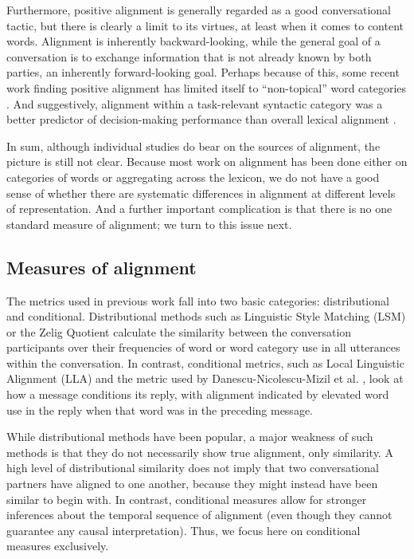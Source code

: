 \documentclass[11pt]{article}
\begin{document}
Furthermore, positive alignment is generally regarded as a good conversational tactic, but there is clearly a limit to its virtues, at least when it comes to content words. Alignment is inherently backward-looking, while the general goal of a conversation is to exchange information that is not already known by both parties, an inherently forward-looking goal. Perhaps because of this, some  recent work finding positive alignment has limited itself to ``non-topical'' word categories \cite{DNMGamonDumais2011,DoyleYurovskyFrank2016}. And suggestively, alignment within a task-relevant syntactic category was a better predictor of decision-making performance than overall lexical alignment \cite{FusaroliEtAl2012}.

In sum, although individual studies do bear on the sources of alignment, the picture is still not clear. Because most work on alignment has been done either on categories of words or aggregating across the lexicon, we do not have a good sense of whether there are systematic differences in alignment at different levels of representation. And a further important complication is that there is no one standard measure of alignment; we turn to this issue next.

\subsection{Measures of alignment}

The metrics used in previous work fall into two basic categories: distributional and conditional. Distributional methods such as Linguistic Style Matching (LSM) \cite{NiederhofferPennebaker2002,IrelandEtAl2011} or the Zelig Quotient \cite{JonesEtAl2014} calculate the similarity between the conversation participants over their frequencies of word or word category use in all utterances within the conversation. In contrast, conditional metrics, such as Local Linguistic Alignment (LLA) \cite{FusaroliEtAl2012,WangReitterYen2014} and the metric used by Danescu-Nicolescu-Mizil et al. , look at how a message conditions its reply, with alignment indicated by elevated word use in the reply when that word was in the preceding message.

While distributional methods have been popular, a major weakness of such methods is that they do not necessarily show true alignment, only similarity. A high level of distributional similarity does not imply that two conversational partners have aligned to one another, because they might instead have been similar to begin with. In contrast, conditional measures allow for stronger inferences about the temporal sequence of alignment (even though they cannot guarantee any causal interpretation). Thus, we focus here on conditional measures exclusively.
\end{document}
